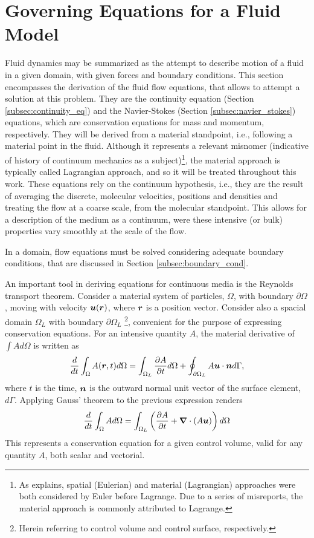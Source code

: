 \section{Governing Equations for a Fluid Model}
\label{sec:fluid_model}

Fluid dynamics may be summarized as the attempt to describe motion of a fluid in a given domain, with given forces and boundary conditions. This section encompasses the derivation of the fluid flow equations, that allows to attempt a solution at this problem. They are the continuity equation (Section \ref{subsec:continuity_eq}) and the Navier-Stokes (Section \ref{subsec:navier_stokes}) equations, which are conservation equations for mass and momentum, respectively. They will be derived from a material standpoint, i.e., following a material point in the fluid. Although it represents a relevant misnomer (indicative of history of continuum mechanics as a subject)\footnote{ As \cite{Truesdell-1954} explains, spatial (Eulerian) and material (Lagrangian) approaches were both considered by Euler before Lagrange. Due to a series of misreports, the material approach is commonly attributed to Lagrange.}, the material approach is typically called Lagrangian approach, and so it will be treated throughout this work. These equations rely on the continuum hypothesis, i.e., they are the result of averaging the discrete, molecular velocities, positions and densities and treating the flow at a coarse scale, from the molecular standpoint. This allows for a description of the medium as a continuum, were these intensive (or bulk) properties vary smoothly at the scale of the flow.

In a domain, flow equations must be solved considering adequate boundary conditions, that are discussed in Section \ref{subsec:boundary_cond}.

An important tool in deriving equations for continuous media is the Reynolds transport theorem. Consider a material system of particles, $\Omega$, with boundary $\partial\Omega$, moving with velocity $\boldsymbol{u}(\boldsymbol{r})$, where $\boldsymbol{r}$ is a position vector. Consider also a spacial domain $\Omega_L$ with boundary $\partial\Omega_L$ \footnote{Herein referring to control volume and control surface, respectively.}, convenient for the purpose of expressing conservation equations. For an intensive quantity $A$, the material derivative of $\int A d\Omega$ is written as
%
	\begin{equation} \label{eq:consv_lagrang}
		\frac{d}{dt}\int_\Omega A(\boldsymbol{r},t)d\Omega = \int_{\Omega_L} \frac{\partial A}{\partial t} d\Omega + \oint_{\partial \Omega_L} A \boldsymbol{u}\cdot\boldsymbol{n} d\Gamma,
	\end{equation}
%
where $t$ is the time, $\boldsymbol{n}$ is the outward normal unit vector of the surface element, $d\Gamma$. Applying Gauss' theorem to the previous expression renders
%
	\begin{equation} \label{eq:consv_lagrang_II}
		\frac{d}{dt}\int_\Omega A d\Omega = \int_{\Omega_L} \left( \frac{\partial A}{\partial t} + \boldsymbol{\nabla} \cdot(A \boldsymbol{u}) \right) d\Omega
	\end{equation}
%
This represents a conservation equation for a given control volume, valid for any quantity $A$, both scalar and vectorial.


